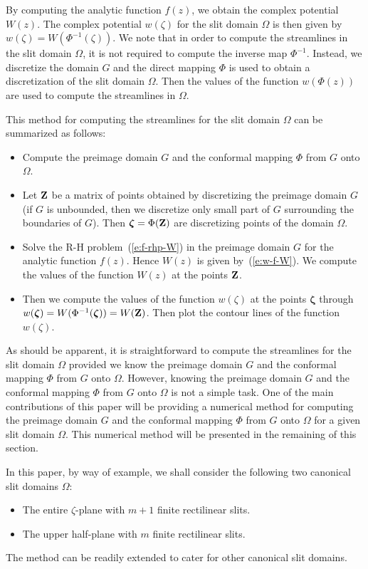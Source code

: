 \documentclass[11pt,a4paper]{article}
\newcommand{\bZ}{{\bf Z}}
\begin{document}
By computing the analytic function $f(z)$, we obtain the complex potential $W(z)$. The complex potential $w(\zeta)$ for the slit domain $\Omega$ is then given by $w(\zeta)=W(\Phi^{-1}(\zeta))$. 
We note that in order to compute the streamlines in the slit domain $\Omega$, it is not required to compute the inverse map $\Phi^{-1}$. Instead, we discretize the domain $G$ and the direct mapping $\Phi$ is used to obtain a discretization of the slit domain $\Omega$. Then the values of the function $w(\Phi(z))$ are used to compute the streamlines in $\Omega$.

This method for computing the streamlines for the slit domain $\Omega$ can be summarized as follows:
\begin{itemize}
	\item Compute the preimage domain $G$ and the conformal mapping $\Phi$ from $G$ onto $\Omega$.
	\item Let $\bZ$ be a matrix of points obtained by discretizing the preimage domain $G$ (if $G$ is unbounded, then we discretize only small part of $G$ surrounding the boundaries of $G$). Then $\boldsymbol{\zeta}=\Phi(\bZ)$ are discretizing points of the domain $\Omega$.
	\item Solve the R-H problem~(\ref{e:f-rhp-W}) in the preimage domain $G$ for the analytic function $f(z)$. Hence $W(z)$ is given by~(\ref{e:w-f-W}). We compute the values of the function $W(z)$ at the points $\bZ$. 
	\item Then we compute the values of the function $w(\zeta)$ at the points $\boldsymbol{\zeta}$ through 
	$w(\boldsymbol{\zeta})=W(\Phi^{-1}(\boldsymbol{\zeta}))=W(\bZ)$. Then plot the contour lines of the function $w(\zeta)$.
\end{itemize}

As should be apparent, it is straightforward to compute the streamlines for the slit domain $\Omega$ provided we know the preimage domain $G$ and the conformal mapping $\Phi$ from $G$ onto $\Omega$. However, knowing the preimage domain $G$ and the conformal mapping $\Phi$ from $G$ onto $\Omega$ is not a simple task. One of the main contributions of this paper will be providing a numerical method for computing the preimage domain $G$ and the conformal mapping $\Phi$ from $G$ onto $\Omega$ for a given slit domain $\Omega$. This numerical method will be presented in the remaining of this section.

In this paper, by way of example, we shall consider the following two canonical slit domains $\Omega$:
\begin{itemize}
	\item The entire $\zeta$-plane with $m+1$ finite rectilinear slits.
	\item The upper half-plane with $m$ finite rectilinear slits.
\end{itemize}
The method can be readily extended to cater for other canonical slit domains.
\end{document}
